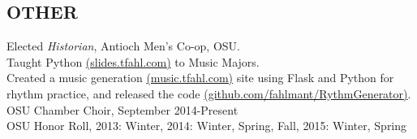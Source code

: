\documentclass[line,margin]{res}
\begin{document}
\begin{resume}
\section{OTHER\\}             
            Elected {\it Historian}, Antioch Men's Co-op, OSU. \\
            Taught Python \href{https://github.com/fahlmant/LessonsForMusicMajors}{(slides.tfahl.com)} to Music Majors. \\
            Created a music generation \href{http://music.tfahl.com}{(music.tfahl.com)} 
            site using Flask and Python for rhythm practice,
            and released the code \href{https://github.com/fahlmant/RhythmGenerator}{(github.com/fahlmant/RythmGenerator)}.\\
            OSU Chamber Choir, September 2014-Present\\
            OSU Honor Roll, 2013: Winter, 2014: Winter, Spring, Fall, 2015: Winter, Spring\\

\end{resume}
\end{document}
